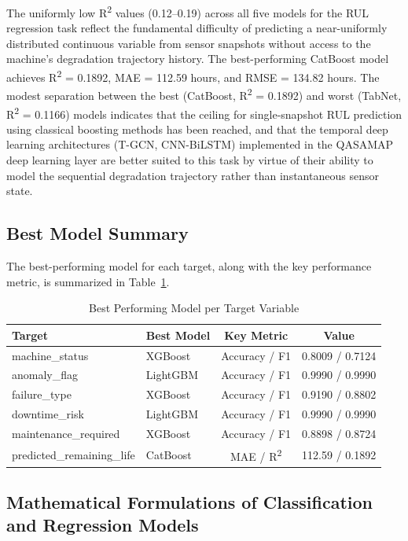 The uniformly low R\textsuperscript{2} values (0.12--0.19) across all five models for the RUL regression task reflect the fundamental difficulty of predicting a near-uniformly distributed continuous variable from sensor snapshots without access to the machine's degradation trajectory history. The best-performing CatBoost model achieves R\textsuperscript{2} = 0.1892, MAE = 112.59 hours, and RMSE = 134.82 hours. The modest separation between the best (CatBoost, R\textsuperscript{2} = 0.1892) and worst (TabNet, R\textsuperscript{2} = 0.1166) models indicates that the ceiling for single-snapshot RUL prediction using classical boosting methods has been reached, and that the temporal deep learning architectures (T-GCN, CNN-BiLSTM) implemented in the QASAMAP deep learning layer are better suited to this task by virtue of their ability to model the sequential degradation trajectory rather than instantaneous sensor state.

\subsection{Best Model Summary}

The best-performing model for each target, along with the key performance metric, is summarized in Table~\ref{tab:best_models}.

\begin{table}[htbp]
\centering
\caption{Best Performing Model per Target Variable}
\label{tab:best_models}
\begin{tabular}{llcc}
\hline
\textbf{Target} & \textbf{Best Model} & \textbf{Key Metric} & \textbf{Value} \\
\hline
machine\_status        & XGBoost    & Accuracy / F1   & 0.8009 / 0.7124 \\
anomaly\_flag          & LightGBM   & Accuracy / F1   & 0.9990 / 0.9990 \\
failure\_type          & XGBoost    & Accuracy / F1   & 0.9190 / 0.8802 \\
downtime\_risk         & LightGBM   & Accuracy / F1   & 0.9990 / 0.9990 \\
maintenance\_required  & XGBoost    & Accuracy / F1   & 0.8898 / 0.8724 \\
predicted\_remaining\_life & CatBoost & MAE / R\textsuperscript{2} & 112.59 / 0.1892 \\
\hline
\end{tabular}
\end{table}

\subsection{Mathematical Formulations of Classification and Regression Models}

